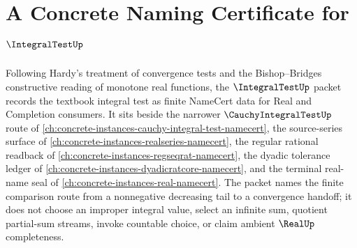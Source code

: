 \chapter{A Concrete Naming Certificate for $\IntegralTestUp$}
\label{ch:concrete-instances-integral-test-namecert}

Following Hardy's treatment of convergence tests and the Bishop--Bridges constructive reading of monotone real functions, the $\IntegralTestUp$ packet records the textbook integral test as finite NameCert data for Real and Completion consumers. It sits beside the narrower $\CauchyIntegralTestUp$ route of \autoref{ch:concrete-instances-cauchy-integral-test-namecert}, the source-series surface of \autoref{ch:concrete-instances-realseries-namecert}, the regular rational readback of \autoref{ch:concrete-instances-regseqrat-namecert}, the dyadic tolerance ledger of \autoref{ch:concrete-instances-dyadicratcore-namecert}, and the terminal real-name seal of \autoref{ch:concrete-instances-real-namecert}. The packet names the finite comparison route from a nonnegative decreasing tail to a convergence handoff; it does not choose an improper integral value, select an infinite sum, quotient partial-sum streams, invoke countable choice, or claim ambient $\RealUp$ completeness.

